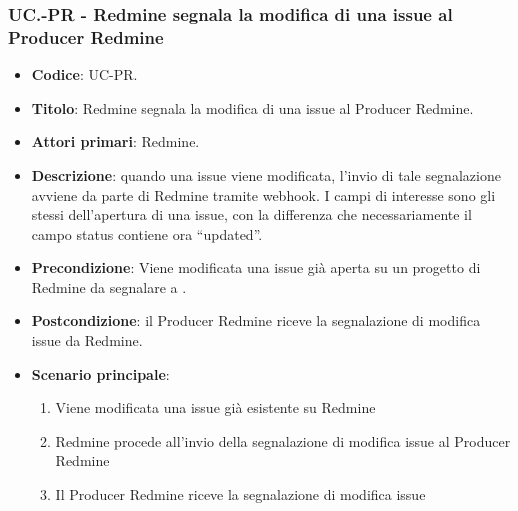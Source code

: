 \subsubsection{UC\theuccount.\thesubuccount-PR - Redmine segnala la modifica di una issue al Producer Redmine}
\begin{itemize}
	\item \textbf{Codice}: UC\theuccount\thesubuccount-PR.
	\item \textbf{Titolo}: Redmine segnala la modifica di una issue al Producer Redmine.
	\item \textbf{Attori primari}: Redmine.
	\item \textbf{Descrizione}: quando una issue viene modificata, l'invio di tale segnalazione
	avviene da parte di Redmine tramite webhook.
	I campi di interesse sono gli stessi dell'apertura di una issue, con la differenza che necessariamente il campo status contiene ora ``updated''.
	\item \textbf{Precondizione}: Viene modificata una issue già aperta su un
	progetto di Redmine da segnalare a \progetto.
	\item \textbf{Postcondizione}: il Producer Redmine riceve la segnalazione di modifica issue da Redmine.
	\item \textbf{Scenario principale}:
	\begin{enumerate}
		\item Viene modificata una issue già esistente su Redmine
		\item Redmine procede all'invio della segnalazione di modifica issue al Producer Redmine
        \item Il Producer Redmine riceve la segnalazione di modifica issue
	\end{enumerate}

\end{itemize}


